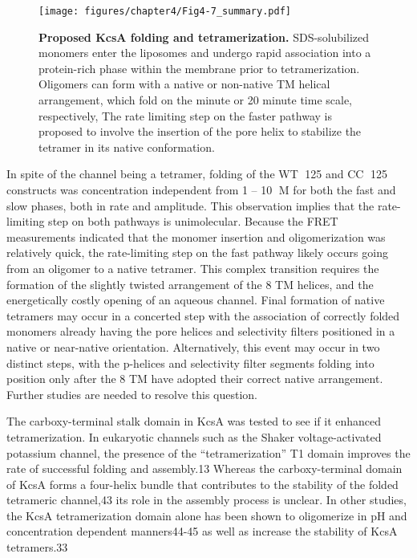 \begin{figure}[!ht]
\begin{center}
	\texttt{[image: figures/chapter4/Fig4-7\_summary.pdf]}
\end{center}
	\caption{\textbf{Proposed KcsA folding and tetramerization.} SDS-solubilized monomers enter the liposomes and undergo rapid association into a protein-rich phase within the membrane prior to tetramerization. Oligomers can form with a native or non-native TM helical arrangement, which fold on the minute or 20 minute time scale, respectively, The rate limiting step on the faster pathway is proposed to involve the insertion of the pore helix to stabilize the tetramer in its native conformation.}
	\label{fig:ch4_f8}
\end{figure}

In spite of the channel being a tetramer, folding of the WT 125 and CC 125 constructs was concentration independent from 1 – 10 M for both the fast and slow phases, both in rate and amplitude. This observation implies that the rate-limiting step on both pathways is unimolecular. Because the FRET measurements indicated that the monomer insertion and oligomerization was relatively quick, the rate-limiting step on the fast pathway likely occurs going from an oligomer to a native tetramer. This complex transition requires the formation of the slightly twisted arrangement of the 8 TM helices, and the energetically costly opening of an aqueous channel. Final formation of native tetramers may occur in a concerted step with the association of correctly folded monomers already having the pore helices and selectivity filters positioned in a native or near-native orientation. Alternatively, this event may occur in two distinct steps, with the p-helices and selectivity filter segments folding into position only after the 8 TM have adopted their correct native arrangement. Further studies are needed to resolve this question.

The carboxy-terminal stalk domain in KcsA was tested to see if it enhanced tetramerization. In eukaryotic channels such as the Shaker voltage-activated potassium channel, the presence of the “tetramerization” T1 domain improves the rate of successful folding and assembly.13 Whereas the carboxy-terminal domain of KcsA forms a four-helix bundle that contributes to the stability of the folded tetrameric channel,43 its role in the assembly process is unclear. In other studies, the KcsA tetramerization domain alone has been shown to oligomerize in pH and concentration dependent manners44-45 as well as increase the stability of KcsA tetramers.33

